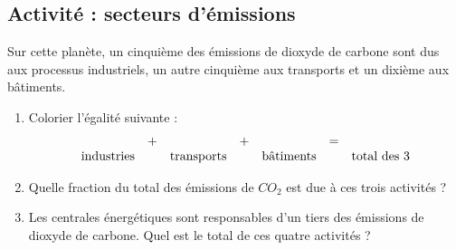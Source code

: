 
\subsection*{Activité : secteurs d'émissions}

Sur cette planète, un cinquième des émissions de dioxyde de carbone sont dus aux processus industriels, un autre cinquième aux transports et un dixième aux bâtiments. 
\begin{enumerate}
    \item
Colorier l'égalité suivante :
\begin{equation*}
    \begin{array}[]{ccccccc}
    &+&&+&&=&\\
    \text{industries}&&\text{transports}&&\text{bâtiments}&&\text{total des \( 3\)}
    \end{array}
\end{equation*}
\item
Quelle fraction du total des émissions de \( CO_2\) est due à ces trois activités ?
\item
Les centrales énergétiques sont responsables d'un tiers des émissions de dioxyde de carbone. Quel est le total de ces quatre activités ?
\end{enumerate}

